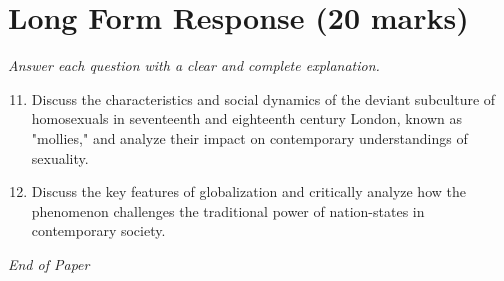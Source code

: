 \documentclass[12pt]{article}
\begin{document}
\section*{Long Form Response (20 marks)}
\textit{Answer each question with a clear and complete explanation.}
\begin{enumerate}[label=\arabic*.]
\setcounter{enumi}{10}
\item Discuss the characteristics and social dynamics of the deviant subculture of homosexuals in seventeenth and eighteenth century London, known as "mollies," and analyze their impact on contemporary understandings of sexuality.
\item Discuss the key features of globalization and critically analyze how the phenomenon challenges the traditional power of nation-states in contemporary society.
\end{enumerate}

\vfill
\noindent\textit{End of Paper}
\end{document}

